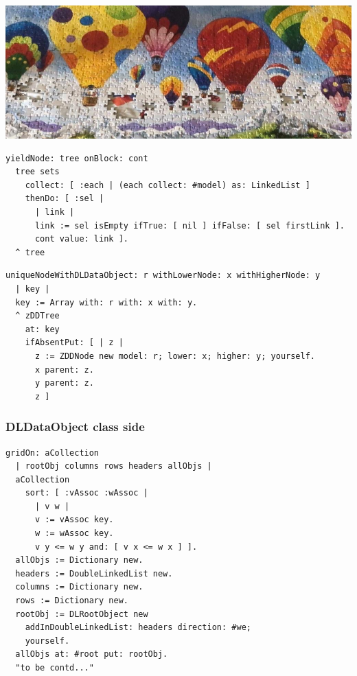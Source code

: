 \documentclass[10pt]{beamer}
\begin{document}
\begin{frame}{ }
  \vfill
  \vfill
  \includegraphics[height=.5\textheight,width=\textwidth]{balloon-puzzle.jpg}
  \vfill
\end{frame}

\begin{frame}[fragile]
\begin{verbatim}
yieldNode: tree onBlock: cont
  tree sets
    collect: [ :each | (each collect: #model) as: LinkedList ]
    thenDo: [ :sel | 
      | link |
      link := sel isEmpty ifTrue: [ nil ] ifFalse: [ sel firstLink ].
      cont value: link ].
  ^ tree
\end{verbatim}
\vfill
\begin{verbatim}
uniqueNodeWithDLDataObject: r withLowerNode: x withHigherNode: y
  | key |
  key := Array with: r with: x with: y.
  ^ zDDTree
    at: key
    ifAbsentPut: [ | z |
      z := ZDDNode new model: r; lower: x; higher: y; yourself.
      x parent: z.
      y parent: z.
      z ]
\end{verbatim}
\end{frame}


\begin{frame}[fragile]
\frametitle{DLDataObject class side}
\begin{verbatim}
gridOn: aCollection
  | rootObj columns rows headers allObjs |
  aCollection
    sort: [ :vAssoc :wAssoc | 
      | v w |
      v := vAssoc key.
      w := wAssoc key.
      v y <= w y and: [ v x <= w x ] ].
  allObjs := Dictionary new.
  headers := DoubleLinkedList new.
  columns := Dictionary new.
  rows := Dictionary new.
  rootObj := DLRootObject new
    addInDoubleLinkedList: headers direction: #we;
    yourself.
  allObjs at: #root put: rootObj.
  "to be contd..."
\end{verbatim}
\end{frame}
\end{document}
